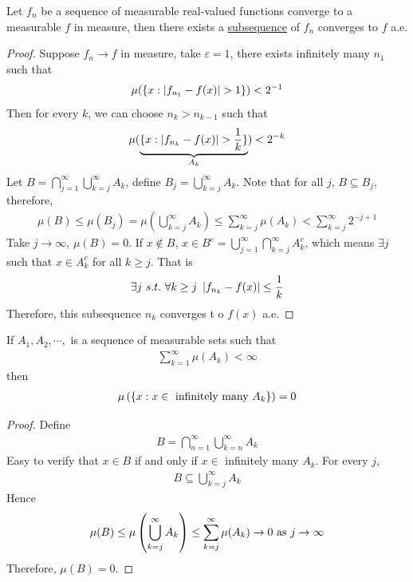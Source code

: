 \documentclass[11pt]{article}
\begin{document}
	\begin{proposition}
		Let $f_n$ be a sequence of measurable real-valued functions converge to a measurable $f$ in measure, then there exists a \ul{subsequence} of $f_n$ converges to $f$ a.e.
		\begin{proof}
			Suppose $f_n \to f$ in measure, take $\varepsilon = 1$, there exists infinitely many $n_1$ such that
			\begin{align}
				\mu(\{x : \left \vert {f_{n_1} - f(x)} \right \vert > 1 \}) < 2^{-1}
			\end{align}
			Then for every $k$, we can choose $n_k > n_{k-1}$ such that
			\begin{align}
				\mu(\underbrace{\{x : \left \vert {f_{n_k} - f(x)} \right \vert > \frac{1}{k} \}}_{A_k}) < 2^{-k}
			\end{align}
			Let $B = \bigcap_{j=1}^\infty \bigcup_{k=j}^\infty A_k$, define $B_j = \bigcup_{k=j}^\infty A_k$.
			Note that for all $j$, $B \subseteq B_j$, therefore,
			\begin{align}
				\mu(B) \leq \mu(B_j) = \mu(\bigcup_{k=j}^\infty A_k) \leq \sum_{k=j}^\infty \mu(A_k) < \sum_{k=j}^\infty 2^{-j+1}
			\end{align}
			Take $j \to \infty$, $\mu(B) = 0$. If $x \notin B$, $x \in B^c = \bigcup_{j=1}^\infty \bigcap_{k=j}^\infty A_k^c$, which means $\exists j$ such that $x \in A_k^c$ for all $k \geq j$. That is
			\begin{align}
				\exists j\ s.t.\ \forall k \geq j\ \left \vert {f_{n_k} - f(x)} \right \vert \leq \frac{1}{k}
			\end{align}
			Therefore, this subsequence $n_k$ converges t	o $f(x)$ a.e.
		\end{proof}
	\end{proposition}
	
	\begin{lemma}
		If $A_1, A_2, \cdots, $ is a sequence of measurable sets such that
		\begin{align}
			\sum_{k=1}^\infty \mu(A_k) < \infty
		\end{align}
		then
		\begin{align}
			\mu\left(\left\{ x: x \in \text{{ infinitely many }} A_k \right\} \right) = 0
		\end{align}
		\begin{proof}
			Define
			\begin{align}
				B = \bigcap_{n=1}^\infty \bigcup_{k=n}^\infty A_k
			\end{align}
			Easy to verify that $x \in B$ if and only if $x \in $ infinitely many $A_k$. For every $j$,
			\begin{align}
				B \subseteq \bigcup_{k=j}^\infty A_k
			\end{align}
			Hence
			\begin{align}
				\mu(B) \leq \mu \left(\bigcup_{k=j}^\infty A_k\right) \leq \sum_{k=j}^\infty \mu(A_k) \to 0 \text{{ as }} j \to \infty
			\end{align}
			Therefore, $\mu(B) = 0$.
		\end{proof}
	\end{lemma}
	
\end{document}
